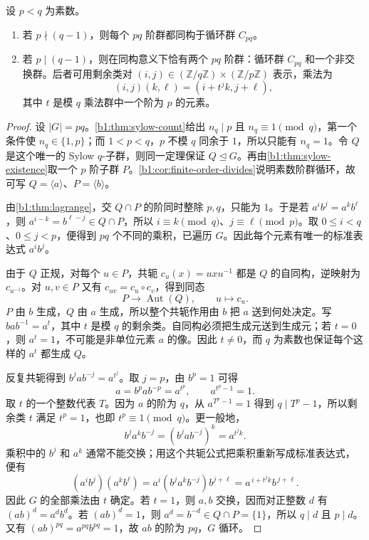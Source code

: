 \begin{theorem}[两素数乘积阶群的分类]\label{b1:thm:groups-order-pq}
	设 \(p<q\) 为素数。
	\begin{enumerate}
		\item 若 \(p\nmid(q-1)\)，则每个 \(pq\) 阶群都同构于循环群 \(C_{pq}\)。
		\item 若 \(p\mid(q-1)\)，则在同构意义下恰有两个 \(pq\) 阶群：循环群 \(C_{pq}\) 和一个非交换群。后者可用剩余类对 \((i,j)\in(\mathbb Z/q\mathbb Z)\times(\mathbb Z/p\mathbb Z)\) 表示，乘法为
			\[
				(i,j)(k,\ell)=(i+t^jk,j+\ell),
			\]
			其中 \(t\) 是模 \(q\) 乘法群中一个阶为 \(p\) 的元素。
	\end{enumerate}
\end{theorem}
\begin{proof}
	设 \(|G|=pq\)。\cref{b1:thm:sylow-count}给出 \(n_q\mid p\) 且 \(n_q\equiv1\pmod q\)，第一个条件使 \(n_q\in\{1,p\}\)；而 \(1<p<q\)，\(p\) 不模 \(q\) 同余于 \(1\)，所以只能有 \(n_q=1\)。令 \(Q\) 是这个唯一的 Sylow \(q\)-子群，则同一定理保证 \(Q\trianglelefteq G\)。再由\cref{b1:thm:sylow-existence}取一个 \(p\) 阶子群 \(P\)。\cref{b1:cor:finite-order-divides}说明素数阶群循环，故可写 \(Q=\langle a\rangle\)、\(P=\langle b\rangle\)。

	由\cref{b1:thm:lagrange}，交 \(Q\cap P\) 的阶同时整除 \(p,q\)，只能为 \(1\)。于是若 \(a^ib^j=a^kb^\ell\)，则 \(a^{i-k}=b^{\ell-j}\in Q\cap P\)，所以 \(i\equiv k\pmod q\)、\(j\equiv\ell\pmod p\)。取 \(0\leq i<q\)、\(0\leq j<p\)，便得到 \(pq\) 个不同的乘积，已遍历 \(G\)。因此每个元素有唯一的标准表达式 \(a^ib^j\)。

	由于 \(Q\) 正规，对每个 \(u\in P\)，共轭 \(c_u(x)=uxu^{-1}\) 都是 \(Q\) 的自同构，逆映射为 \(c_{u^{-1}}\)。对 \(u,v\in P\) 又有 \(c_{uv}=c_u\circ c_v\)，得到同态
	\[
		P\longrightarrow\operatorname{Aut}(Q),\qquad u\longmapsto c_u.
	\]
	\(P\) 由 \(b\) 生成，\(Q\) 由 \(a\) 生成，所以整个共轭作用由 \(b\) 把 \(a\) 送到何处决定。写 \(bab^{-1}=a^t\)，其中 \(t\) 是模 \(q\) 的剩余类。自同构必须把生成元送到生成元；若 \(t=0\)，则 \(a^t=1\)，不可能是非单位元素 \(a\) 的像。因此 \(t\ne0\)，而 \(q\) 为素数也保证每个这样的 \(a^t\) 都生成 \(Q\)。

	反复共轭得到 \(b^jab^{-j}=a^{t^j}\)。取 \(j=p\)，由 \(b^p=1\) 可得
	\[
		a=b^pab^{-p}=a^{t^p},\qquad a^{t^p-1}=1.
	\]
	取 \(t\) 的一个整数代表 \(T\)。因为 \(a\) 的阶为 \(q\)，从 \(a^{T^p-1}=1\) 得到 \(q\mid T^p-1\)，所以剩余类 \(t\) 满足 \(t^p=1\)，也即 \(t^p\equiv1\pmod q\)。更一般地，
	\[
		b^ja^kb^{-j}=(b^jab^{-j})^k=a^{t^jk}.
	\]
	乘积中的 \(b^j\) 和 \(a^k\) 通常不能交换；用这个共轭公式把乘积重新写成标准表达式，便有
	\[
		(a^ib^j)(a^kb^\ell) =a^i(b^ja^kb^{-j})b^{j+\ell} =a^{\,i+t^jk}b^{\,j+\ell}.
	\]
	因此 \(G\) 的全部乘法由 \(t\) 确定。若 \(t=1\)，则 \(a,b\) 交换，因而对正整数 \(d\) 有 \((ab)^d=a^db^d\)。若 \((ab)^d=1\)，则 \(a^d=b^{-d}\in Q\cap P=\{1\}\)，所以 \(q\mid d\) 且 \(p\mid d\)。又有 \((ab)^{pq}=a^{pq}b^{pq}=1\)，故 \(ab\) 的阶为 \(pq\)，\(G\) 循环。


\end{proof}
